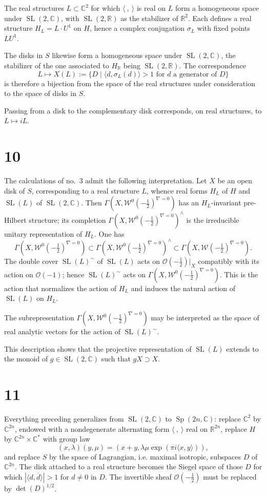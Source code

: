 \documentclass[11pt]{article}
\newcommand{\C}{\mathbb C}
\newcommand{\R}{\mathbb R}
\newcommand{\cO}{\mathcal O}
\newcommand{\cW}{\mathcal W}
\newcommand{\half}{\tfrac12}
\DeclareMathOperator{\SL}{SL}
\DeclareMathOperator{\Sp}{Sp}
\begin{document}
The real structures $L\subset\C^2$ for which $\langle\ ,\ \rangle$ is real on $L$ form a homogeneous space under $\SL(2,\C)$, with $\SL(2,\R)$ as the stabilizer of $\R^2$. Each defines a real structure $H_L=L\cdot U^1$ on $H$, hence a complex conjugation $\sigma_L$ with fixed points $LU^1$.

The disks in $S$ likewise form a homogeneous space under $\SL(2,\C)$, the stabilizer of the one associated to $H_\R$ being $\SL(2,\R)$. The correspondence
\[
L\longmapsto X(L):=\{D\mid \langle d,\sigma_L(d)\rangle>1\text{ for }d\text{ a generator of }D\}
\]
is therefore a bijection from the space of the real structures under consideration to the space of disks in $S$.

Passing from a disk to the complementary disk corresponds, on real structures, to $L\mapsto iL$.

\section*{10}
The calculations of no.~3 admit the following interpretation. Let $X$ be an open disk of $S$, corresponding to a real structure $L$, whence real forms $H_L$ of $H$ and $\SL(L)$ of $\SL(2,\C)$. Then $\Gamma(X,\cW^0(-\half)^{\nabla=0})$ has an $H_L$-invariant pre-Hilbert structure; its completion $\Gamma(X,\cW^0(-\half)^{\nabla=0})^\wedge$ is the irreducible unitary representation of $H_L$. One has
\[
\Gamma(X,\cW^0(-\half)^{\nabla=0})
\subset
\Gamma(X,\cW^0(-\half)^{\nabla=0})^\wedge
\subset
\Gamma(X,\cW(-\half)^{\nabla=0}).
\]
The double cover $\SL(L)^\sim$ of $\SL(L)$ acts on $\cO(-\half)|_X$ compatibly with its action on $\cO(-1)$; hence $\SL(L)^\sim$ acts on $\Gamma(X,\cW^0(-\half)^{\nabla=0})$. This is the action that normalizes the action of $H_L$ and induces the natural action of $\SL(L)$ on $H_L$.

The subrepresentation $\Gamma(X,\cW^0(-\half)^{\nabla=0})$ may be interpreted as the space of real analytic vectors for the action of $\SL(L)^\sim$.

This description shows that the projective representation of $\SL(L)$ extends to the monoid of $g\in\SL(2,\C)$ such that $gX\supset X$.

\section*{11}
Everything preceding generalizes from $\SL(2,\C)$ to $\Sp(2n,\C)$: replace $\C^2$ by $\C^{2n}$, endowed with a nondegenerate alternating form $\langle\ ,\ \rangle$ real on $\R^{2n}$, replace $H$ by $\C^{2n}\times\C^*$ with group law
\[
(x,\lambda)(y,\mu)=(x+y,\lambda\mu\exp(\pi i\langle x,y\rangle)),
\]
and replace $S$ by the space of Lagrangian, i.e. maximal isotropic, subspaces $D$ of $\C^{2n}$. The disk attached to a real structure becomes the Siegel space of those $D$ for which $|\langle d,\overline d\rangle|>1$ for $d\ne0$ in $D$. The invertible sheaf $\cO(-\half)$ must be replaced by $\det(D)^{1/2}$.
\end{document}
